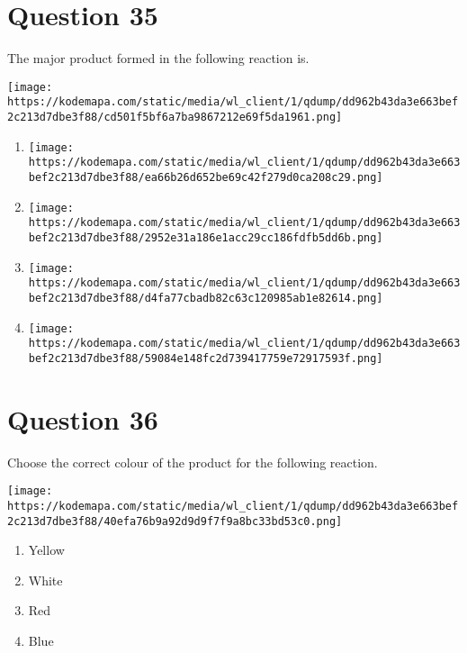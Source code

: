 \documentclass{article}
\begin{document}
\section*{Question 35}
The major product formed in the following reaction is.



\texttt{[image: https://kodemapa.com/static/media/wl\_client/1/qdump/dd962b43da3e663bef2c213d7dbe3f88/cd501f5bf6a7ba9867212e69f5da1961.png]}\\


\begin{enumerate}[label=(\alph*)]
\item \texttt{[image: https://kodemapa.com/static/media/wl\_client/1/qdump/dd962b43da3e663bef2c213d7dbe3f88/ea66b26d652be69c42f279d0ca208c29.png]}


\item \texttt{[image: https://kodemapa.com/static/media/wl\_client/1/qdump/dd962b43da3e663bef2c213d7dbe3f88/2952e31a186e1acc29cc186fdfb5dd6b.png]}


\item \texttt{[image: https://kodemapa.com/static/media/wl\_client/1/qdump/dd962b43da3e663bef2c213d7dbe3f88/d4fa77cbadb82c63c120985ab1e82614.png]}


\item \texttt{[image: https://kodemapa.com/static/media/wl\_client/1/qdump/dd962b43da3e663bef2c213d7dbe3f88/59084e148fc2d739417759e72917593f.png]}


\end{enumerate}
\newpage
\section*{Question 36}
Choose the correct colour of the product for the following reaction.



\texttt{[image: https://kodemapa.com/static/media/wl\_client/1/qdump/dd962b43da3e663bef2c213d7dbe3f88/40efa76b9a92d9d9f7f9a8bc33bd53c0.png]}\\


\begin{enumerate}[label=(\alph*)]
\item Yellow


\item White


\item Red


\item Blue


\end{enumerate}
\newpage
\end{document}

